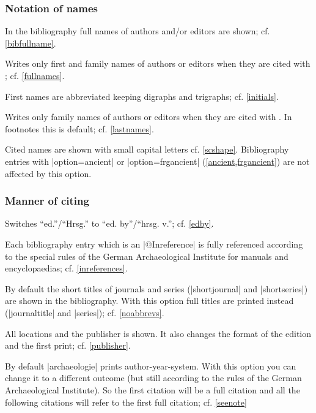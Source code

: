 \documentclass[a4paper,
10pt,
greek,
french,
spanish,
italian,
ngerman,
english
]{ltxdoc}
\begin{document}
\subsubsection{Notation of names}
In the bibliography full names of authors and/or editors are shown; cf. \cref{bibfullname}.

Writes only first and family names of authors or editors when they are cited with ; cf. \cref{fullnames}.

First names are abbreviated keeping digraphs and trigraphs; cf. \cref{initials}.

Writes only family names of authors or editors when they are cited with .
In footnotes this is default; cf.  \cref{lastnames}.

Cited names are shown with small capital letters cf. \cref{scshape}.
Bibliography entries with |option={ancient}| or |option={frgancient}| (\cref{ancient,frgancient}) are not affected by this option.

\subsubsection{Manner of citing}

Switches \enquote{ed.}/\enquote{Hrsg.} to \enquote{ed. by}/\enquote{hrsg. v.}; cf. \cref{edby}.

Each bibliography entry which is an |@Inreference| is fully referenced according to the special rules of the 
German Archaeological Institute for manuals and encyclopaedias; cf. \cref{inreferences}.

By default the short titles of journals and series (|shortjournal| and |shortseries|) are shown in the bibliography.
With this option full titles are printed instead (|journaltitle| and |series|); cf. \cref{noabbrevs}.

All locations and the publisher is shown. 
It also changes the format of the edition and the first print; cf. \cref{publisher}.

By default |archaeologie| prints author-year-system. 
With this option you can change it to a different outcome (but still according to the rules of the German Archaeological Institute). 
So the first citation will be a full citation and all the following citations will refer to the first full citation; cf. \cref{seenote}
\end{document}
